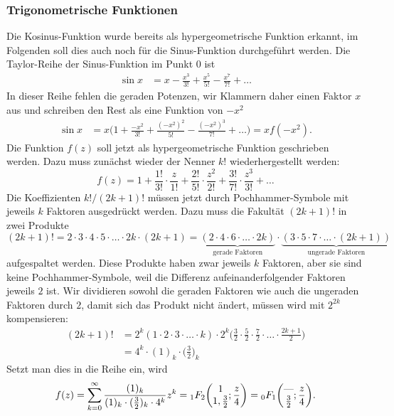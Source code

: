 %
%
\subsubsection{Trigonometrische Funktionen}
%
Die Kosinus-Funktion wurde bereits als hypergeometrische Funktion erkannt,
im Folgenden soll dies auch noch für die Sinus-Funktion
durchgeführt werden.
Die Taylor-Reihe der Sinus-Funktion im Punkt $0$ ist
\begin{align*}
\sin x
&=
x-\frac{x^3}{3!}+\frac{x^5}{5!}-\frac{x^7}{7!}+\dots
\end{align*}
In dieser Reihe fehlen die geraden Potenzen, wir Klammern daher einen
Faktor $x$ aus und schreiben den Rest als eine Funktion von $-x^2$
\begin{align*}
\sin x
&=
x
\biggl(
1+\frac{-x^2}{3!}+\frac{(-x^2)^2}{5!}-\frac{(-x^2)^3}{7!}+\dots
\biggr)
=
x f(-x^2).
\end{align*}
Die Funktion $f(z)$ soll jetzt als hypergeometrische Funktion geschrieben
werden.
Dazu muss zunächst wieder der Nenner $k!$ wiederhergestellt werden:
\begin{equation*}
f(z)
=
1
+
\frac{1!}{3!}\cdot \frac{z}{1!}
+
\frac{2!}{5!}\cdot \frac{z^2}{2!}
+
\frac{3!}{7!}\cdot \frac{z^3}{3!}
+
\dots
\end{equation*}
Die Koeffizienten $k!/(2k+1)!$ müssen jetzt durch Pochhammer-Symbole
mit jeweils $k$ Faktoren ausgedrückt werden.
Dazu muss die Fakultät $(2k+1)!$ in zwei Produkte
\[
(2k+1)!
=
2\cdot 3 \cdot 4\cdot 5\cdot \ldots \cdot 2k \cdot (2k+1)
=
\underbrace{(2\cdot 4 \cdot 6\cdot\ldots\cdot 2k)}_{\textstyle\text{gerade Faktoren}}
\cdot
\underbrace{(3\cdot 5\cdot 7\cdot \ldots \cdot (2k+1))}_{\textstyle\text{ungerade Faktoren}}
\]
aufgespaltet werden.
Diese Produkte haben zwar jeweils $k$ Faktoren, aber sie sind keine
Pochhammer-Symbole, weil die Differenz aufeinanderfolgender Faktoren 
jeweils $2$ ist.
Wir dividieren sowohl die geraden Faktoren wie auch die 
ungeraden Faktoren durch $2$, damit sich das Produkt nicht ändert,
müssen wird mit $2^{2k}$ kompensieren:
\begin{align*}
(2k+1)!
&=
2^k(1\cdot2\cdot3\cdot\ldots\cdot k)
\cdot
2^k
\biggl(
\frac{3}{2}\cdot
\frac{5}{2}\cdot
\frac{7}{2}\cdot
\ldots\cdot
\frac{2k+1}{2}
\biggr)
\\
&=
4^k
\cdot
(1)_k\cdot \biggl(\frac{3}{2}\biggr)_k
\end{align*}
Setzt man dies in die Reihe ein, wird
\begin{equation}
f(z)
=
\sum_{k=0}^\infty
\frac{(1)_k}{(1)_k\cdot (\frac{3}{2})_k\cdot 4^k}
z^k
=
\mathstrut_1F_2\biggl(
\begin{matrix}1\\1,\frac{3}{2}\end{matrix};\frac{z}4
\biggr)
=
\mathstrut_0F_1\biggl(
\begin{matrix}\text{---}\\\frac{3}{2}\end{matrix};\frac{z}4
\biggr).
\label{buch:rekursion:hyperbolisch:eqn:hilfsfunktionf}
\end{equation}
